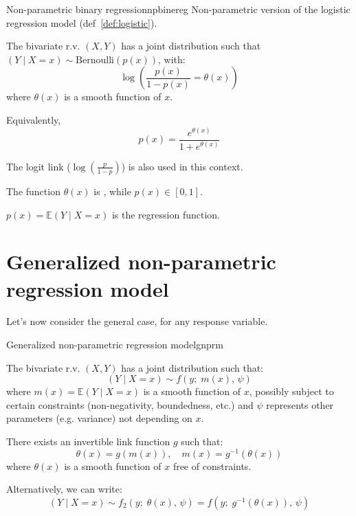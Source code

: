 \begin{definition}{Non-parametric binary regression}{npbinereg} 
    Non-parametric version of the logistic regression model (def~\ref{def:logistic}).

    The bivariate r.v. $(X, Y)$ has a joint distribution such that
    $(Y \mid X = x) \sim \text{Bernoulli}(p(x))$, with:
    \begin{equation*}
        \log\left(
            \frac{p(x)}{1 - p(x)} = \theta(x)
        \right)
    \end{equation*}
    where $\theta(x)$ is a smooth function of $x$.

    Equivalently,
    \begin{equation*}
        p(x) = \frac{e^{\theta(x)}}{1 + e^{\theta(x)}}
    \end{equation*}

    \tcblower

    The logit link ($\log\left(\frac{p}{1 - p}\right)$) is also used in this context.

    The function $\theta(x)$ is , while $p(x) \in [0, 1]$.

    $p(x) = \mathds{E}(Y \mid X = x)$ is the regression function.
\end{definition}


\pagebreak
\section{Generalized non-parametric regression model}
Let's now consider the general case, for any response variable.

\begin{definition}{Generalized non-parametric regression model}{gnprm}

    The bivariate r.v. $(X, Y)$ has a joint distribution such that:
    \begin{equation*}
        (Y \mid X = x) \sim f(y;\; m(x),\, \psi)
    \end{equation*}
    where $m(x) = \mathds{E}(Y \mid X = x)$ is a smooth function of $x$,
    possibly subject to certain constraints (non-negativity, boundedness, etc.)
    and $\psi$ represents other parameters (e.g. variance) not depending on $x$.

    There exists an invertible link function $g$ such that:
    \begin{equation*}
        \theta(x) = g(m(x)), \quad m(x) = g^{-1}(\theta(x))
    \end{equation*}
    where $\theta(x)$ is a smooth function of $x$ free of constraints.

    \tcblower

    Alternatively, we can write:
    \begin{equation*}
        (Y \mid X = x) \sim f_2(y;\; \theta(x),\, \psi) = f(y;\; g^{-1}(\theta(x)),\, \psi)
    \end{equation*}

\end{definition}

